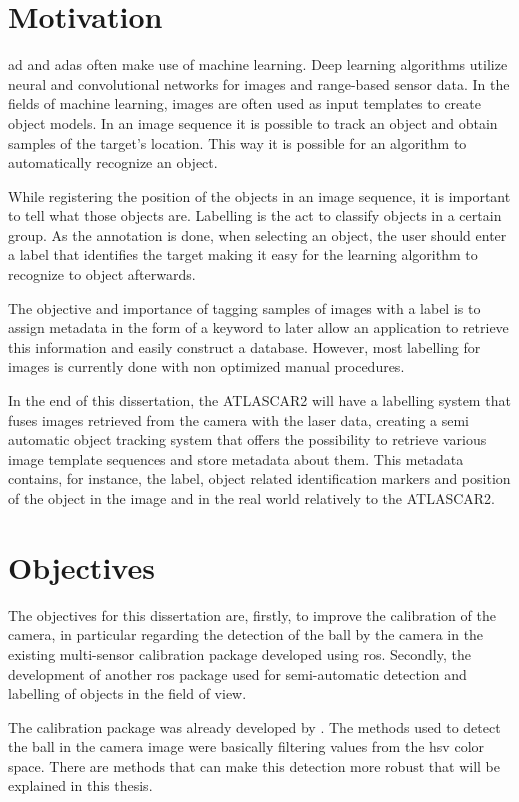 \section{Motivation}

\gls{ad} and \gls{adas} often make use of machine learning. Deep learning algorithms utilize neural and convolutional networks for images and range-based sensor data. In the fields of machine learning, images are often used as input templates to create object models. In an image sequence it is possible to track an object and obtain samples of the target's location. This way it is possible for an algorithm to automatically recognize an object.

While registering the position of the objects in an image sequence, it is important to tell what those objects are. Labelling is the act to classify objects in a certain group. As the annotation is done, when selecting an object, the user should enter a label that identifies the target making it easy for the learning algorithm to recognize to object afterwards.

The objective and importance of tagging samples of images with a label is to assign metadata in the form of a keyword to later allow an application to retrieve this information and easily construct a database. However, most labelling for images is currently done with non optimized manual procedures.

In the end of this dissertation, the ATLASCAR2 will have a labelling system that fuses images retrieved from the camera with the laser data, creating a semi automatic object tracking system that offers the possibility to retrieve various image template sequences and store metadata about them. This metadata contains, for instance, the label, object related identification markers and position of the object in the image and in the real world relatively to the ATLASCAR2.

\section{Objectives}
The objectives for this dissertation are, firstly, to improve the calibration of the camera, in particular regarding the detection of the ball by the camera in the existing multi-sensor calibration package developed using \gls{ros}. Secondly, the development of another \gls{ros} package used for semi-automatic detection and labelling of objects in the field of view.

The calibration package was already developed by \cite{VieiradaSilva2016}. The methods used to detect the ball in the camera image were basically filtering values from the \gls{hsv} color space. There are methods that can make this detection more robust that will be explained in this thesis. 

